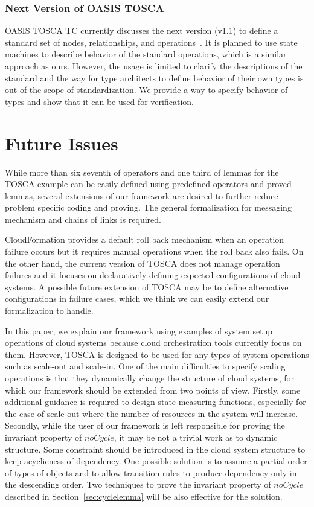 \documentclass[12pt]{report}
\begin{document}
\subsubsection{Next Version of OASIS TOSCA}
OASIS TOSCA TC currently discusses the next version (v1.1) to define a
standard set of nodes, relationships, and
operations~\cite{TOSCAYAML}. It is planned to use state machines to
describe behavior of the standard operations, which is a similar
approach as ours. However, the usage is limited to clarify the
descriptions of the standard and the way for type architects to define
behavior of their own types is out of the scope of standardization. We
provide a way to specify behavior of types and show that it can be
used for verification.

\section{Future Issues}
While more than six seventh of operators and one third of lemmas for
the TOSCA example can be easily defined using predefined operators and
proved lemmas, several extensions of our framework are desired to
further reduce problem specific coding and proving. The general formalization
for messaging mechanism and chains of links is required.

CloudFormation provides a default roll back mechanism when an
operation failure occurs but it requires manual operations when the
roll back also fails. On the other hand, the current version of TOSCA
does not manage operation failures and it focuses on declaratively
defining expected configurations of cloud systems. A possible
future extension of TOSCA may be to define alternative configurations
in failure cases, which we think we can easily extend our
formalization to handle.

In this paper, we explain our framework using examples of system setup
operations of cloud systems because cloud orchestration tools
currently focus on them. However, TOSCA is designed to be used for any
types of system operations such as scale-out and scale-in. One of the
main difficulties to specify scaling operations is that they
dynamically change the structure of cloud systems, for which our
framework should be extended from two points of view. Firstly, some
additional guidance is required to design state measuring functions,
especially for the case of scale-out where the number of resources in
the system will increase. Secondly, while the user of our framework is
left responsible for proving the invariant property of $noCycle$, it
may be not a trivial work as to dynamic structure. Some constraint
should be introduced in the cloud system structure to keep acyclicness
of dependency. One possible solution is to assume a partial order of
types of objects and to allow transition rules to produce dependency
only in the descending order. Two techniques to prove the invariant
property of $noCycle$ described in Section~\ref{sec:cyclelemma} will
be also effective for the solution.
\end{document}
